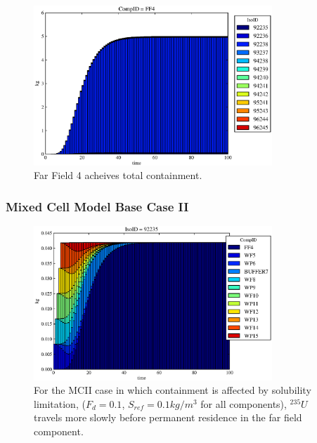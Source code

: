 \begin{frame}[ctb!]
\begin{figure}
\begin{minipage}[b]{0.45\linewidth}
  \includegraphics[width=0.8\textwidth]{./images/mcIII0.eps}
  \caption[Case MCI FF Contaminants.]{ 
    Far Field 4 acheives total containment.
    }
  \label{fig:mcII}


  \end{minipage}
\end{figure}

\end{frame}


\begin{frame}[ctb!]
  \frametitle{Mixed Cell Model Base Case II}
\begin{figure}[ht]
\centering
\includegraphics[width=0.8\textwidth]{./images/mcIII.eps}
\caption[$^{235}U$ residence. Mixed Cell Coupled Sorption and Solubility Limitation.]{
For the MCII case in which containment is affected by solubility limitation,
($F_{d}=0.1$, $S_{ref}=0.1kg/m^3$ for all components), $^{235}U$ travels more slowly
before permanent residence in the far field component.
}
\label{fig:mcIIIall}
\end{figure}
\end{frame}

